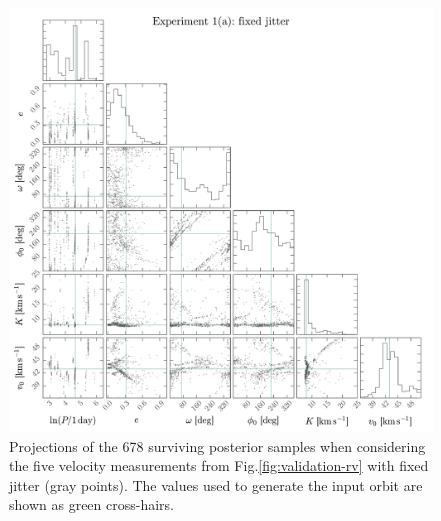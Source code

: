 \documentclass[manuscript, letterpaper]{aastex6}
\begin{document}
\begin{figure}[p]
\begin{center}
\includegraphics[width=\textwidth]{figures/validation-corner-a.pdf}
\end{center}
\caption{%
Projections of the 678 surviving posterior samples when considering the five velocity measurements from
Fig.\ref{fig:validation-rv} with fixed jitter (gray
points).
The values used to generate the input orbit are shown as green cross-hairs.
\label{fig:validation-corner-a}}
\end{figure}
\end{document}
